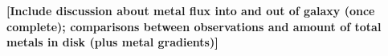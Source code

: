 \documentclass[]{emulateapj}
\begin{document}
\textbf{[Include discussion about metal flux into and out of galaxy (once complete); comparisons between observations and amount of total metals in disk (plus metal gradients)]} 


\begin{figure}
\centerline{
}
\centerline{
}
\end{figure}
\end{document}
